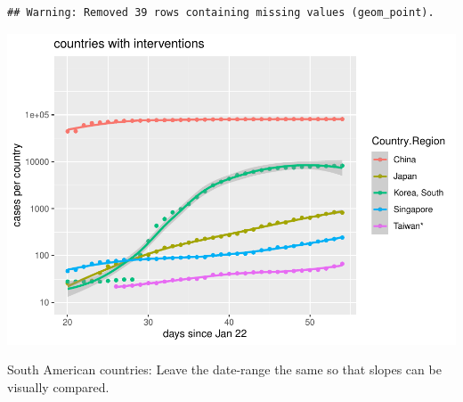 \documentclass[]{article}
\begin{document}
\begin{verbatim}
## Warning: Removed 39 rows containing missing values (geom_point).
\end{verbatim}

\includegraphics{PlotData_files/figure-latex/plotICountries-1.pdf}

South American countries: Leave the date-range the same so that slopes
can be visually compared.
\end{document}
